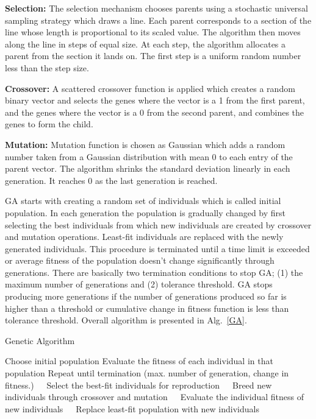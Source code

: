 \documentclass[number,1p,12pt]{elsarticle}
\begin{document}
{\bf Selection:} The selection mechanism chooses parents using a stochastic universal sampling strategy which draws a line. Each parent corresponds to a section of the line whose length is proportional to its scaled value. The algorithm then moves along the line in steps of equal size. At each step, the algorithm allocates a parent from the section it lands on. The first step is a uniform random number less than the step size.

{\bf Crossover:} A scattered crossover function is applied which creates a random binary vector and selects the genes where the vector is a 1 from the first parent, and the genes where the vector is a 0 from the second parent, and combines the genes to form the child. 

{\bf Mutation:} Mutation function is chosen as Gaussian which adds a random number taken from a Gaussian distribution with mean 0 to each entry of the parent vector. The algorithm shrinks the standard deviation linearly in each generation. It reaches 0 as the last generation is reached. 

GA starts with creating a random set of individuals which is called initial population. In each generation the population is gradually changed by first selecting the best individuals from which new individuals are created by crossover and mutation operations. Least-fit individuals are replaced with the newly generated individuals. This procedure is terminated until a time limit is exceeded or average fitness of the population doesn't change significantly through generations. There are basically two termination conditions to stop GA; (1) the maximum number of generations and (2) tolerance threshold. GA stops producing more generations if the number of generations produced so far is higher than a threshold or cumulative change in fitness function is less than tolerance threshold.  Overall algorithm is presented in Alg.~\ref{GA}.


\begin{algorithm}
\caption{Genetic Algorithm}\label{GA}
\begin{algorithmic}[1]
\State Choose initial population 
\State Evaluate the fitness of each individual in that population
\State Repeat until termination (max. number of generation, change in fitness.)
\State $\hspace{10pt}$ Select the best-fit individuals for reproduction
\State $\hspace{10pt}$ Breed new individuals through crossover and mutation
\State $\hspace{10pt}$ Evaluate the individual fitness of new individuals
\State $\hspace{10pt}$ Replace least-fit population with new individuals
\EndProcedure
\end{algorithmic}
\end{algorithm}
\end{document}

